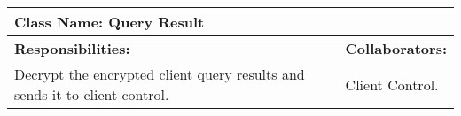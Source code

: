 \documentclass[]{article}
\begin{document}
\begin{enumerate}[a)]
\begin{table}[ht]
\begin{tabular}{|p{5cm}|p{5cm}|}
		\hline				
		\end{tabular}
	\end{table}

\begin{table}[ht]
		\centering
		\begin{tabular}{|p{5cm}|p{5cm}|}
		\hline 
		 \multicolumn{2}{|l|}{\textbf{Class Name: Query Result}} \\
		\hline
		\textbf{Responsibilities: } & \textbf{Collaborators:} \\
		\hline
		Decrypt the encrypted client query results and sends it to client control.
		\vspace{1in} & Client Control.\\
		
		\hline				
		\end{tabular}
	\end{table}
\end{enumerate}
\end{document}
